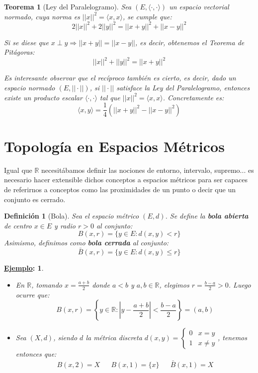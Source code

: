 \documentclass[10pt,a4paper,openright]{book}
\theoremstyle{break}
\newtheorem*{defi}{Definición}
\newtheorem*{theo}{Teorema}
\newtheorem*{ej}{\underline{Ejemplo}:}
\begin{document}
\begin{theo}[Ley del Paralelogramo]
Sea $(E, \langle \cdot , \cdot \rangle)$ un espacio vectorial normado, cuya norma es $||x||^2 = \langle x,x\rangle$, se cumple que:
$$2||x||^2 + 2||y||^2 = ||x+y||^2 + ||x-y||^2$$

Si se diese que $x \perp y \Rightarrow ||x+y|| = ||x-y||$, es decir, obtenemos el Teorema de Pitágoras:
$$||x||^2 + ||y||^2 = ||x+y||^2$$

Es interesante observar que el recíproco también es cierto, es decir, dado un espacio normado $(E, || \cdot ||)$, si $|| \cdot ||$ satisface la Ley del Paralelogramo, entonces existe un producto escalar $\langle \cdot , \cdot \rangle$ tal que $||x||^2 = \langle x,x\rangle$. Concretamente es:
$$\langle x,y\rangle = \frac{1}{4} \left(||x+y||^2 - ||x-y||^{2}\right)$$
\end{theo}

\section{Topología en Espacios Métricos}
Igual que $\mathbb{R}$ necesitábamos definir las nociones de entorno, intervalo, supremo... es necesario hacer extensible dichos conceptos a espacios métricos para ser capaces de referirnos a conceptos como las proximidades de un punto o decir que un conjunto es cerrado.

\begin{defi}[Bola]
Sea el espacio métrico $(E,d)$. Se define la \textbf{bola abierta} de centro $x\in E$ y radio $r>0$ al conjunto:
$$B(x,r) = \{y \in E : d(x,y) < r\}$$
Asimismo, definimos como \textbf{bola cerrada} al conjunto:
$$\bar{B}(x,r) = \{y \in E : d(x,y) \leq r\}$$
\end{defi}

\begin{ej}
\begin{itemize}
\item En $\mathbb{R}$, tomando $x = \frac{a+b}{2}$ donde $a < b$ y $a,b \in \mathbb{R}$, elegimos $r = \frac{b-a}{2} > 0$. Luego ocurre que:
$$B(x,r) = \left\lbrace y \in \mathbb{R} : \left| y - \frac{a+b}{2}\right| < \frac{b-a}{2}\right\rbrace = (a,b)$$

\item Sea $(X,d)$, siendo $d$ la métrica discreta $d(x,y) = \begin{cases} 0 & x=y \\ 1 & x \neq y \end{cases}$, tenemos entonces que:
\begin{align*}
B(x,2) = X && B(x,1) = \{x\} && \bar{B}(x,1) = X
\end{align*}
\end{itemize}
\end{ej}
\end{document}
